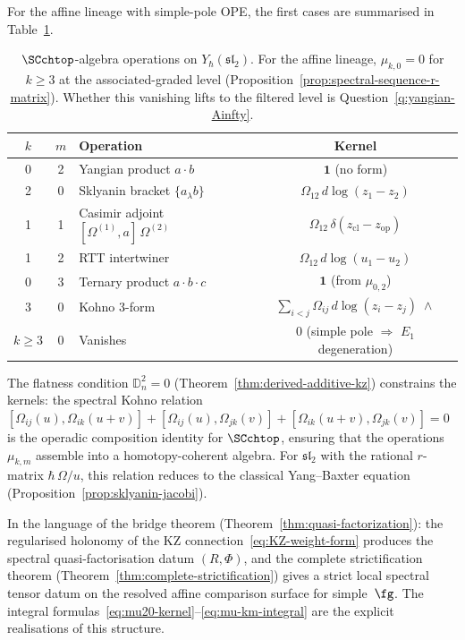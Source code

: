\begin{computation}
For the affine lineage with simple-pole OPE, the
first cases are summarised in
Table~\ref{tab:SC-operations-sl2}.
\begin{table}[ht]
\centering
\begin{tabular}{cclc}
\toprule
$k$ & $m$ & Operation & Kernel \\
\midrule
0 & 2 & Yangian product $a \cdot b$
 & $\mathbf{1}$ (no form) \\
2 & 0 & Sklyanin bracket
 $\{a {}_\lambda b\}$
 & $\Omega_{12}\,d\log(z_1 - z_2)$ \\
1 & 1 & Casimir adjoint
 $[\Omega^{(1)}, a]\,\Omega^{(2)}$
 & $\Omega_{12}\,\delta(z_{\mathrm{cl}} - z_{\mathrm{op}})$ \\
1 & 2 & RTT intertwiner
 & $\Omega_{12}\,d\log(u_1 - u_2)$ \\
0 & 3 & Ternary product $a \cdot b \cdot c$
 & $\mathbf{1}$ (from $\mu_{0,2}$) \\
3 & 0 & Kohno 3-form
 & $\sum_{i<j}\Omega_{ij}\,d\log(z_i - z_j)
 \;\wedge$ \\
$k \ge 3$ & 0 & Vanishes
 & $0$ \;(simple pole $\Rightarrow$ $E_1$ degeneration)\\
\bottomrule
\end{tabular}
\caption{$\SCchtop$-algebra operations on
$Y_\hbar(\mathfrak{sl}_2)$. For the affine lineage,
$\mu_{k,0} = 0$ for $k \ge 3$ at the associated-graded level
(Proposition~\ref{prop:spectral-sequence-r-matrix}).
Whether this vanishing lifts to the filtered level is
Question~\ref{q:yangian-Ainfty}.}
\label{tab:SC-operations-sl2}
\end{table}

The flatness condition $\mathbb{D}_n^2 = 0$
(Theorem~\ref{thm:derived-additive-kz}) constrains the
kernels: the spectral Kohno relation
$[\Omega_{ij}(u), \Omega_{ik}(u+v)] +
[\Omega_{ij}(u), \Omega_{jk}(v)] +
[\Omega_{ik}(u+v), \Omega_{jk}(v)] = 0$
is the operadic composition identity for $\SCchtop$,
ensuring that the operations $\mu_{k,m}$ assemble into a
homotopy-coherent algebra. For $\mathfrak{sl}_2$ with the
rational $r$-matrix $\hbar\,\Omega/u$, this relation reduces to
the classical Yang--Baxter equation
(Proposition~\ref{prop:sklyanin-jacobi}).

In the language of the bridge theorem
(Theorem~\ref{thm:quasi-factorization}): the regularised
holonomy of the KZ connection~\eqref{eq:KZ-weight-form}
produces the spectral quasi-factorisation datum $(R, \Phi)$,
and the complete strictification theorem
(Theorem~\ref{thm:complete-strictification}) gives a strict local
spectral tensor datum on the resolved affine comparison surface for
simple~$\fg$. The integral
formulas~\eqref{eq:mu20-kernel}--\eqref{eq:mu-km-integral}
are the explicit realisations of this structure.
\end{computation}

